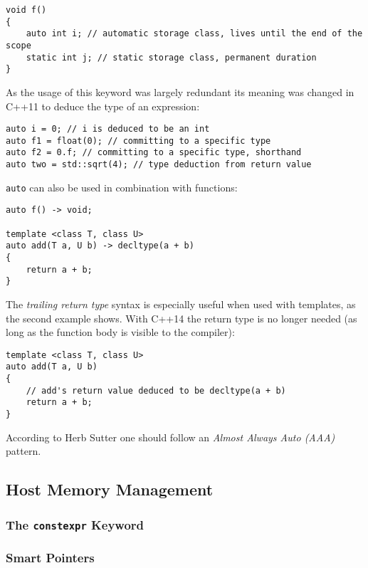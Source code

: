 \begin{lstlisting}
void f()
{
    auto int i; // automatic storage class, lives until the end of the scope
    static int j; // static storage class, permanent duration
}
\end{lstlisting}

As the usage of this keyword was largely redundant its meaning was changed in C++11 to deduce the type of an expression:

\begin{lstlisting}
auto i = 0; // i is deduced to be an int
auto f1 = float(0); // committing to a specific type
auto f2 = 0.f; // committing to a specific type, shorthand
auto two = std::sqrt(4); // type deduction from return value
\end{lstlisting}

\texttt{auto} can also be used in combination with functions:

\begin{lstlisting}
auto f() -> void;

template <class T, class U>
auto add(T a, U b) -> decltype(a + b)
{
    return a + b;
}
\end{lstlisting}

The \textit{trailing return type} syntax is especially useful when used with templates, as the second example shows. With C++14 the return type is no longer needed (as long as the function body is visible to the compiler):

\begin{lstlisting}
template <class T, class U>
auto add(T a, U b)
{
    // add's return value deduced to be decltype(a + b)
    return a + b;
}
\end{lstlisting}

According to Herb Sutter\cite{sutteraaa} one should follow an \textit{Almost Always Auto (AAA)} pattern.

\subsection{Host Memory Management}



\subsubsection{The \texttt{constexpr} Keyword}
\subsubsection{Smart Pointers}


